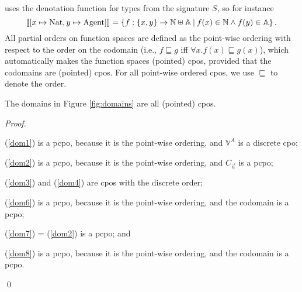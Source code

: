 \documentclass[orivec,final]{llncs-href}
\newcommand{\nat}{\mathbb{N}}
\newcommand{\agentset}{\mathbb{A}}
\newcommand{\verdictset}[1]{\mathbb{V}^{#1}}
\newcommand{\dendom}[1]{\llbracket #1 \rrbracket}
\begin{document}
uses the denotation function for types from the signature $S$, so for
instance
\[
\dendom{[x \mapsto
  \ctpnat, y \mapsto \ctpagent]} = \left\{ f : \{x,y\} \to \nat \uplus
\agentset \mathbin{|} f(x) \in \nat \land f(y) \in \agentset \right\}.
\]
All partial orders on function spaces are
defined as the point-wise ordering with respect to the order on the codomain
(i.e., $f \sqsubseteq g$ iff $\forall x. f(x) \sqsubseteq g(x)$),
which automatically makes the function spaces (pointed) cpos,
provided that the codomains are (pointed) cpos. For all point-wise
ordered cpos, we use $\sqsubseteq$ to denote the order.
\begin{lemma}\label{lemma:cpos}
  The domains in Figure \ref{fig:domains} are all (pointed) cpos.
\end{lemma}
\begin{proof}
  \begin{inparaenum}
  \item[(\ref{dom1})] is a pcpo, because it is the point-wise ordering,
    and $\verdictset{A}$ is a discrete cpo;
  \item[(\ref{dom2})] is a pcpo, because it is the point-wise ordering,
    and $C_{\vec{a}}$ is a pcpo;
  \item[(\ref{dom3}) and (\ref{dom4})] are cpos with the discrete order;
  \item[(\ref{dom6})] is a pcpo, because it is the point-wise
    ordering, and the codomain is a pcpo;
  \item[(\ref{dom7}) = (\ref{dom2})] is a pcpo; and
  \item[(\ref{dom8})] is a pcpo, because it is the point-wise
    ordering, and the codomain is a pcpo.
  \end{inparaenum}
  \qed
\end{proof}
\end{document}
